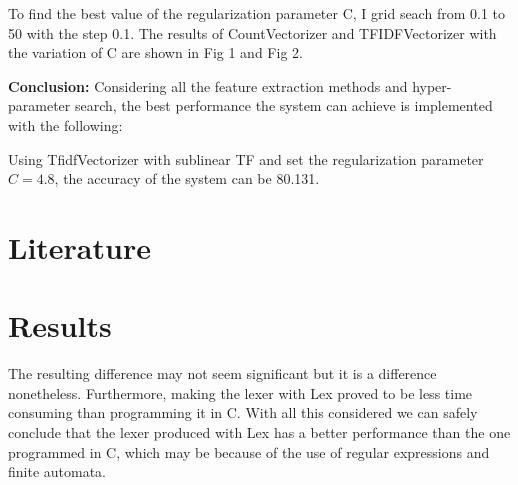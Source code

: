 \documentclass[letterpaper, 10 pt, conference]{ieeeconf}  %
\begin{document}
To find the best value of the regularization parameter C, I grid seach from 0.1 to 50 with the step 0.1. The results of CountVectorizer and TFIDFVectorizer with the variation of C are shown in Fig 1 and Fig 2.




\textbf{Conclusion: } Considering all the feature extraction methods and hyper-parameter search, the best performance the system can achieve is implemented with the following: 

Using TfidfVectorizer with sublinear TF and set the regularization parameter $C=4.8$, the accuracy of the system can be 80.131.




\section{Literature}




\section{Results}

The resulting difference may not seem significant but it is a difference nonetheless. Furthermore, making the lexer with Lex proved to be less time consuming than programming it in C. With all this considered we can safely conclude that the lexer produced with Lex has a better performance than the one programmed in C, which may be because of the use of regular expressions and finite automata.


\addtolength{\textheight}{-12cm}   %
\end{document}
